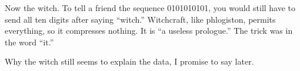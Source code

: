 Now the witch. To tell a friend the sequence 0101010101, you would still have to send all ten digits after saying ``witch.'' Witchcraft, like phlogiston, permits everything, so it compresses nothing. It is ``a useless prologue.'' The trick was in the word ``it.''

Why the witch still seems to explain the data, I promise to say later.
